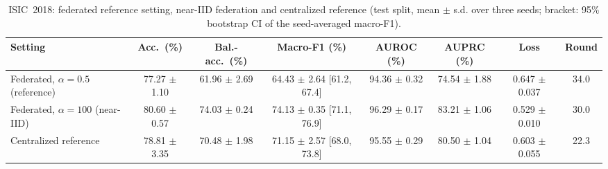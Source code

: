 \begin{table}[!t]
\caption{ISIC~2018: federated reference setting, near-IID federation and centralized reference (test split, mean $\pm$ s.d. over three seeds; bracket: 95\% bootstrap CI of the seed-averaged macro-F1).}
\label{tab:18-main}
\centering
\footnotesize
\begin{tabular}{lccccccc}
\toprule
Setting & Acc.\ (\%) & Bal.-acc.\ (\%) & Macro-F1 (\%) & AUROC (\%) & AUPRC (\%) & Loss & Round \\
\midrule
Federated, $\alpha{=}0.5$ (reference) & 77.27 $\pm$ 1.10 & 61.96 $\pm$ 2.69 & 64.43 $\pm$ 2.64 [61.2, 67.4] & 94.36 $\pm$ 0.32 & 74.54 $\pm$ 1.88 & 0.647 $\pm$ 0.037 & 34.0 \\
Federated, $\alpha{=}100$ (near-IID) & 80.60 $\pm$ 0.57 & 74.03 $\pm$ 0.24 & 74.13 $\pm$ 0.35 [71.1, 76.9] & 96.29 $\pm$ 0.17 & 83.21 $\pm$ 1.06 & 0.529 $\pm$ 0.010 & 30.0 \\
Centralized reference & 78.81 $\pm$ 3.35 & 70.48 $\pm$ 1.98 & 71.15 $\pm$ 2.57 [68.0, 73.8] & 95.55 $\pm$ 0.29 & 80.50 $\pm$ 1.04 & 0.603 $\pm$ 0.055 & 22.3 \\
\bottomrule
\end{tabular}
\end{table}